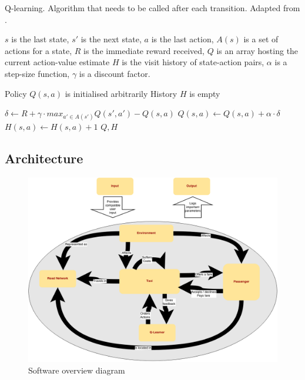\begin{algorithm}
  \caption{
  Q-learning. Algorithm that needs to be called after each transition. 
  Adapted from \textcite{Sutton1998ai+reinforcement}. 
  \label{algorithm:q}}

  \begin{algorithmic}[1]
    \Require 
      \Statex $s$ is the last state,
      \Statex $s'$ is the next state,
      \Statex $a$ is the last action,
      \Statex $A(s)$ is a set of actions for a state,
      \Statex $R$ is the immediate reward received,
      \Statex $Q$ is an array hosting the current action-value estimate
      \Statex $H$ is the visit history of state-action pairs,
      \Statex $\alpha$ is a step-size function,
      \Statex $\gamma$ is a discount factor.

      \Statex Policy $Q(s, a)$ is initialised arbitrarily
      \Statex History $H$ is empty

      \State $\delta \gets R + 
              \gamma \cdot max_{a' \in A(s')} Q(s', a') - Q(s, a)$
      \State $Q(s, a) \gets Q(s, a) + \alpha \cdot \delta$
      \State $H(s, a) \gets H(s, a) + 1$
      \Return $Q, H$      
    \EndFunction
  \end{algorithmic}

\end{algorithm}

\subsection{Architecture} 
\label{sec:design:architecture}


\begin{figure}
  \begin{center}
    \includegraphics[width=\textwidth]{../figures/software_overview}
    \caption{
      Software overview diagram
      \label{figure:design:software}
    }
  \end{center}
\end{figure}

